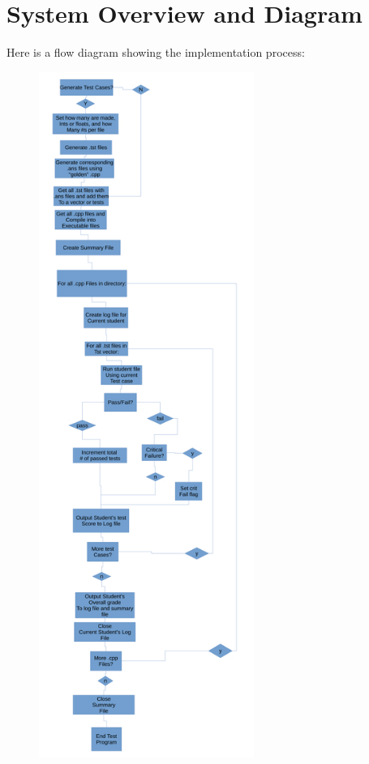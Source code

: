 \section{System Overview and Diagram}
Here is a flow diagram showing the implementation process:

%


\begin{figure}[h]
\centering \includegraphics[width=7cm]{sprint2Algorithm}
\end{figure}



